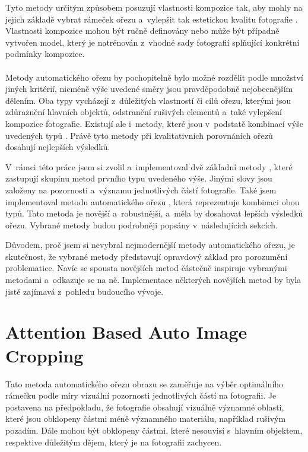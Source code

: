 Tyto metody určitým způsobem posuzují vlastnosti kompozice tak, aby mohly na jejich základě vybrat rámeček ořezu a~vylepšit tak estetickou kvalitu fotografie \cite{Luo2007,Tang2013}. Vlastnosti kompozice mohou být ručně definovány nebo může být případně vytvořen model, který je natrénován z~vhodné sady fotografií splňující konkrétní podmínky kompozice.

\paragraph{}
Metody automatického ořezu by pochopitelně bylo možné rozdělit podle množství jiných kritérií, nicméně výše uvedené směry jsou pravděpodobně nejobecnějším dělením. Oba typy vycházejí z~důležitých vlastností či cílů ořezu, kterými jsou zdůraznění hlavních objektů, odstranění rušivých elementů a~také vylepšení kompozice fotografie. Existují ale i~metody, které jsou v~podstatě kombinací výše uvedených typů \cite{Fang2014,Yan2013}. Právě tyto metody při kvalitativních porovnáních ořezů dosahují nejlepších výsledků.

V~rámci této práce jsem si zvolil a~implementoval dvě základní metody \cite{Stentiford2007,Suh2003}, které zastupují skupinu metod prvního typu uvedeného výše. Jinými slovy jsou založeny na pozornosti a~významu jednotlivých částí fotografie. Také jsem implementoval metodu automatického ořezu \cite{Fang2014}, která reprezentuje kombinaci obou typů. Tato metoda je novější a~robustnější, a~měla by dosahovat lepších výsledků ořezu. Vybrané metody budou podrobněji popsány v~následujících sekcích.

Důvodem, proč jsem si nevybral nejmodernější metody automatického ořezu, je skutečnost, že vybrané metody představují opravdový základ pro porozumění problematice. Navíc se spousta novějších metod částečně inspiruje vybranými metodami a~odkazuje se na ně. Implementace některých novějších metod by byla jistě zajímavá z~pohledu budoucího vývoje. 


\section{Attention Based Auto Image Cropping} \label{section:metoda1}
Tato metoda automatického ořezu obrazu \cite{Stentiford2007} se zaměřuje na výběr optimálního rámečku podle míry vizuální pozornosti jednotlivých částí na fotografii. Je postavena na předpokladu, že fotografie obsahují vizuálně významné oblasti, které jsou obklopeny částmi méně významného materiálu, například rušivým pozadím. Dále mohou být obklopeny částmi, které nesouvisí s~hlavním objektem, respektive důležitým dějem, který je na fotografii zachycen. 

